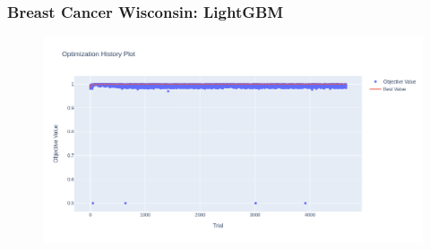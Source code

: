 \documentclass{beamer}
\begin{document}





\begin{frame}
\frametitle{Breast Cancer Wisconsin: LightGBM}
\begin{figure}[H]
 \centering
 \includegraphics[scale=0.3]{optuna_lgbm_cancer.png}
\end{figure}
\end{frame}
\end{document}
